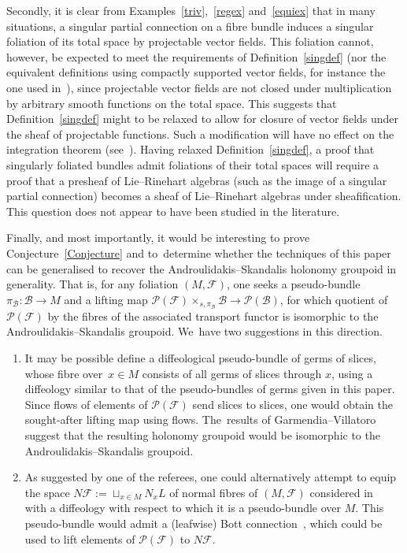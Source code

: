 \documentclass[10pt,a4paper]{amsart}
\numberwithin{equation}{section}
\def\FF{{\mathcal{F}}}
\def\BB{{\mathcal{B}}}
\def\PP{{\mathcal{P}}}
\begin{document}
Secondly, it is clear from Examples~\ref{triv},~\ref{regex} and~\ref{equiex} that in many situations, a singular partial connection on a fibre bundle induces a singular foliation of its total space by projectable vector fields. This foliation cannot, however, be expected to meet the requirements of Definition~\ref{singdef} (nor the equivalent definitions using compactly supported vector fields, for instance the one used in~\cite{iakovos2}), since projectable vector fields are not closed under multiplication by arbitrary smooth functions on the total space. This suggests that Definition~\ref{singdef} might to be relaxed to allow for closure of vector fields under the sheaf of projectable functions. Such a modification will have no effect on the integration theorem (see~\cite[Theorem~4.2(e)]{sussmann}). Having relaxed Definition~\ref{singdef}, a proof that singularly foliated bundles admit foliations of their total spaces will require a proof that a presheaf of Lie--Rinehart algebras (such as the image of a singular partial connection) becomes a sheaf of Lie--Rinehart algebras under sheafification. This question does not appear to have been studied in the literature.

Finally, and most importantly, it would be interesting to prove Conjecture~\ref{Conjecture} and to~deter\-mine whether the techniques of this paper can be generalised to recover the Androulidakis--Skandalis holonomy groupoid in generality. That is, for any foliation $(M,\FF)$, one seeks a pseudo-bundle $\pi_{\BB}\colon \BB\rightarrow M$ and a lifting map $\PP(\FF)\times_{s,\pi_{\BB}}\BB\rightarrow\PP(\BB)$, for which quotient of $\PP(\FF)$ by the fibres of the associated transport functor is isomorphic to the Androulidakis--Skandalis groupoid. We~have two suggestions in this direction.
\begin{enumerate}\itemsep=0pt
\item It may be possible define a diffeological pseudo-bundle of germs of slices, whose fibre over~$x\in M$ consists of all germs of slices through $x$, using a diffeology similar to that of the pseudo-bundles of germs given in this paper. Since flows of elements of $\PP(\FF)$ send slices to slices, one would obtain the sought-after lifting map using flows. The~results of Garmendia--Villatoro~\cite{VilGar1} suggest that the resulting holonomy groupoid would be isomorphic to the Androulidakis--Skandalis groupoid.
\item As suggested by one of the referees, one could alternatively attempt to equip the space $N\FF:=\sqcup_{x\in M}N_{x}L$ of normal fibres of $(M,\FF)$ considered in~\cite{iakovos4} with a diffeology with respect to which it is a pseudo-bundle over $M$. This pseudo-bundle would admit a (leafwise) Bott connection~\cite[p.~374]{iakovos4}, which could be used to lift elements of $\PP(\FF)$ to $N\FF$.
\end{enumerate}
\end{document}
